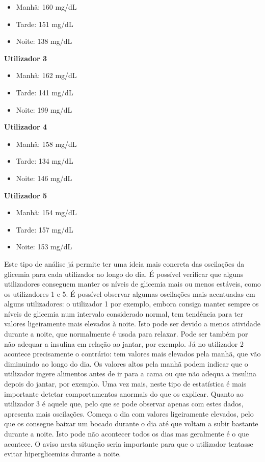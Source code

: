 \begin{itemize}
\item Manhã: 160 mg/dL
\item Tarde: 151 mg/dL
\item Noite: 138 mg/dL
\end{itemize}

\textbf{Utilizador 3}

\begin{itemize}
\item Manhã: 162 mg/dL
\item Tarde: 141 mg/dL
\item Noite: 199 mg/dL
\end{itemize}

\textbf{Utilizador 4}

\begin{itemize}
\item Manhã: 158 mg/dL
\item Tarde: 134 mg/dL
\item Noite: 146 mg/dL
\end{itemize}

\textbf{Utilizador 5}

\begin{itemize}
\item Manhã: 154 mg/dL
\item Tarde: 157 mg/dL
\item Noite: 153 mg/dL
\end{itemize}

Este tipo de análise já permite ter uma ideia mais concreta das oscilações da glicemia para cada utilizador ao longo do dia. É possível verificar que alguns utilizadores conseguem manter os níveis de glicemia mais ou menos estáveis, como os utilizadores 1 e 5. É possível observar algumas oscilações mais acentuadas em alguns utilizadores: o utilizador 1 por exemplo, embora consiga manter sempre os níveis de glicemia num intervalo considerado normal, tem tendência para ter valores ligeiramente mais elevados à noite. Isto pode ser devido a menos atividade durante a noite, que normalmente é usada para relaxar. Pode ser também por não adequar a insulina em relação ao jantar, por exemplo. Já no utilizador 2 acontece precisamente o contrário: tem valores mais elevados pela manhã, que vão diminuindo ao longo do dia. Os valores altos pela manhã podem indicar que o utilizador ingere alimentos antes de ir para a cama ou que não adequa a insulina depois do jantar, por exemplo. Uma vez mais, neste tipo de estatística é mais importante detetar comportamentos anormais do que os explicar. 
Quanto ao utilizador 3 é aquele que, pelo que se pode observar apenas com estes dados, apresenta mais oscilações. Começa o dia com valores ligeiramente elevados, pelo que os consegue baixar um bocado durante o dia até que voltam a subir bastante durante a noite. Isto pode não acontecer todos os dias mas geralmente é o que acontece. O aviso nesta situação seria importante para que o utilizador tentasse evitar hiperglicemias durante a noite.

